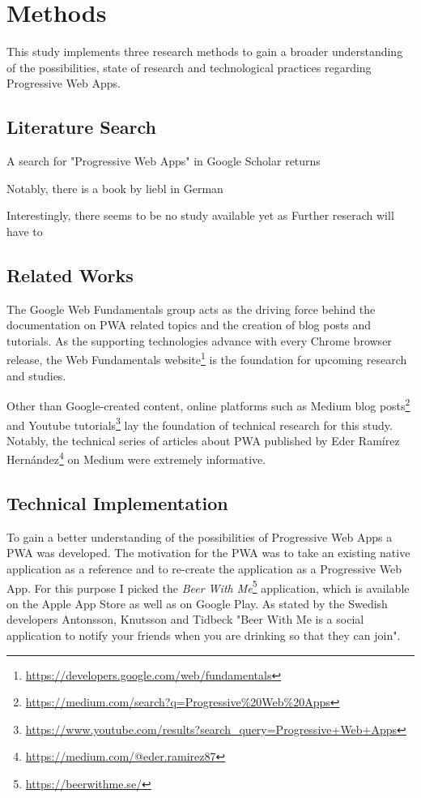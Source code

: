 \chapter{Methods}

This study implements three research methods to gain a broader understanding of the possibilities, state of research and technological practices regarding Progressive Web Apps.

\section{Literature Search}

A search for "Progressive Web Apps" in Google Scholar returns

Notably, there is a book by liebl in German \cite{liebelProgressiveWebApps2019}

Interestingly, there seems to be no study available yet as
Further reserach will have to


\section{Related Works}
The Google Web Fundamentals group acts as the driving force behind the documentation on PWA related topics and the creation of blog posts and tutorials. As the supporting technologies advance with every Chrome browser release, the Web Fundamentals website\footnote{\url{https://developers.google.com/web/fundamentals}} is the foundation for upcoming research and studies.

Other than Google-created content, online platforms such as Medium blog posts\footnote{\url{https://medium.com/search?q=Progressive\%20Web\%20Apps}} and Youtube tutorials\footnote{\url{https://www.youtube.com/results?search_query=Progressive+Web+Apps}} lay the foundation of technical research for this study. Notably, the technical series of articles about PWA published by Eder Ramírez Hernández\footnote{\url{https://medium.com/@eder.ramirez87}} on Medium were extremely informative.

\section{Technical Implementation}
To gain a better understanding of the possibilities of Progressive Web Apps a PWA was developed. The motivation for the PWA was to take an existing native application as a reference and to re-create the application as a Progressive Web App. For this purpose I picked the \textit{Beer With Me}\footnote{\url{https://beerwithme.se/}} application, which is available on the Apple App Store as well as on Google Play. As stated by the Swedish developers Antonsson, Knutsson and Tidbeck "Beer With Me is a social application to notify your friends when you are drinking so that they can join".
